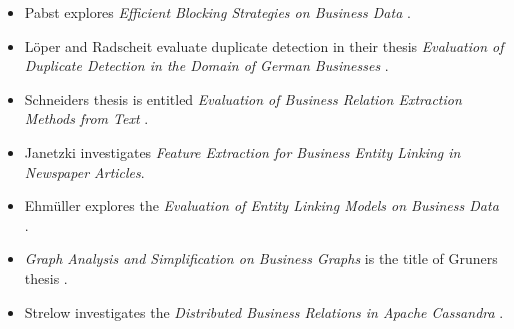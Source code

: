 \begin{itemize}
\item Pabst explores \emph{Efficient Blocking Strategies on Business Data} \cite{pabst}.
\item Löper and Radscheit evaluate duplicate detection in their thesis \emph{Evaluation of Duplicate Detection in the Domain of German Businesses} \cite{loeperradscheit}.
\item Schneider\grq s thesis is entitled \emph{Evaluation of Business Relation Extraction Methods from Text} \cite{schneider}.
\item Janetzki investigates \emph{Feature Extraction for Business Entity Linking in Newspaper Articles}.
\item Ehmüller explores the \emph{Evaluation of Entity Linking Models on Business Data} \cite{ehmueller}.
\item \emph{Graph Analysis and Simplification on Business Graphs} is the title of Gruner\grq s thesis \cite{gruner}.
\item Strelow investigates the \emph{Distributed Business Relations in Apache Cassandra} \cite{strelow}.

\end{itemize}